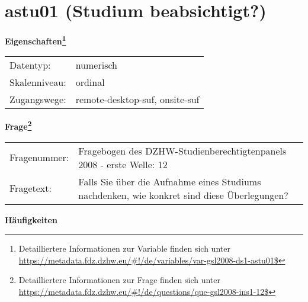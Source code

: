 
    \setcounter{footnote}{0}

    \vspace*{-1.8cm}
	\section{astu01 (Studium beabsichtigt?)}
	\label{section:astu01}



    \vspace*{0.5cm}
    \noindent\textbf{Eigenschaften\footnote{Detailliertere Informationen zur Variable finden sich unter
		\url{https://metadata.fdz.dzhw.eu/\#!/de/variables/var-gsl2008-ds1-astu01$}}}\\
	\begin{tabularx}{\hsize}{@{}lX}
	Datentyp: & numerisch \\
	Skalenniveau: & ordinal \\
	Zugangswege: &
	  remote-desktop-suf, 
	  onsite-suf
 \\
    \end{tabularx}



				\vspace*{0.5cm}
                \noindent\textbf{Frage\footnote{Detailliertere Informationen zur Frage finden sich unter
		              \url{https://metadata.fdz.dzhw.eu/\#!/de/questions/que-gsl2008-ins1-12$}}}\\
				\begin{tabularx}{\hsize}{@{}lX}
					Fragenummer: &
					  Fragebogen des DZHW-Studienberechtigtenpanels 2008 - erste Welle:
					  12
 \\
					Fragetext: & Falls Sie über die Aufnahme eines Studiums nachdenken, wie konkret sind diese Überlegungen? \\
				\end{tabularx}





        		\vspace*{0.5cm}
                \noindent\textbf{Häufigkeiten}

